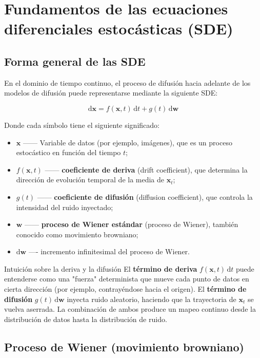 \section{Fundamentos de las ecuaciones diferenciales estocásticas (SDE)}

\subsection{Forma general de las SDE}

En el dominio de tiempo continuo, el proceso de difusión hacia adelante de los modelos de difusión puede representarse mediante la siguiente SDE:

$$
\mathrm{d}\mathbf{x} = f(\mathbf{x}, t)\,\mathrm{d}t + g(t)\,\mathrm{d}\mathbf{w}
$$

Donde cada símbolo tiene el siguiente significado:

\begin{itemize}
    \item $\mathbf{x}$ —— Variable de datos (por ejemplo, imágenes), que es un proceso estocástico en función del tiempo $t$;
    \item $f(\mathbf{x}, t)$ —— \textbf{coeficiente de deriva} (drift coefficient), que determina la dirección de evolución temporal de la media de $\mathbf{x}_t$;
    \item $g(t)$ —— \textbf{coeficiente de difusión} (diffusion coefficient), que controla la intensidad del ruido inyectado;
    \item $\mathbf{w}$ —— \textbf{proceso de Wiener estándar} (proceso de Wiener), también conocido como movimiento browniano;
    \item $\mathrm{d}\mathbf{w}$ —- incremento infinitesimal del proceso de Wiener.
\end{itemize}

\begin{importantbox}{Intuición sobre la deriva y la difusión}
El \textbf{término de deriva} $f(\mathbf{x}, t)\,\mathrm{d}t$ puede entenderse como una "fuerza" determinista que mueve cada punto de datos en cierta dirección (por ejemplo, contrayéndose hacia el origen). El \textbf{término de difusión} $g(t)\,\mathrm{d}\mathbf{w}$ inyecta ruido aleatorio, haciendo que la trayectoria de $\mathbf{x}_t$ se vuelva aserrada. La combinación de ambos produce un mapeo continuo desde la distribución de datos hasta la distribución de ruido.
\end{importantbox}

\subsection{Proceso de Wiener (movimiento browniano)}


